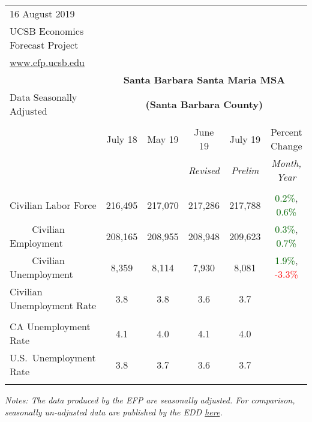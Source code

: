 \documentclass[12pt]{article}
\begin{document}
\begin{table}
\begin{tabular}{|l|c|c|c|c|c|}
\multicolumn{1}{l}{\small 16 August 2019} & \multicolumn{5}{c}{} \\
\multicolumn{1}{l}{\small UCSB Economics Forecast Project} & \multicolumn{5}{c}{} \\
\multicolumn{1}{l}{\small \href{http://www.efp.ucsb.edu/}{www.efp.ucsb.edu}} & \multicolumn{5}{c}{} \\
\multicolumn{1}{c}{} & \multicolumn{5}{c}{\large \textbf{Santa Barbara Santa Maria MSA}} \\
\multicolumn{1}{l}{\small Data Seasonally Adjusted} & \multicolumn{5}{c}{\small \textbf{(Santa Barbara County)}} \\ \hline \hline
& & & & & \\
 & July 18 & May 19 & June 19 & July 19 & Percent Change \\
 & & & \small \textit{Revised} & \small \textit{Prelim} & \small \textit{Month, Year} \\ \hline
& & & & & \\
Civilian Labor Force & 216,495 & 217,070 & 217,286 & 217,788 & \textcolor{darkgreen}{0.2\%}, \textcolor{darkgreen}{0.6\%} \\
$\qquad$ \small Civilian Employment & 208,165 & 208,955 & 208,948 & 209,623 & \textcolor{darkgreen}{0.3\%}, \textcolor{darkgreen}{0.7\%} \\
$\qquad$ \small Civilian Unemployment & 8,359 & 8,114 & 7,930 & 8,081 & \textcolor{darkgreen}{1.9\%}, \textcolor{red}{-3.3\%} \\
Civilian Unemployment Rate & 3.8 & 3.8 & 3.6 & 3.7 & \\
& & & & & \\
CA Unemployment Rate & 4.1 & 4.0 & 4.1 & 4.0 & \\
U.S.\ Unemployment Rate & 3.8 & 3.7 & 3.6 & 3.7 & \\
& & & & & \\ \hline \hline
\end{tabular}
\par
\vspace{.5em}
\footnotesize
\textit{Notes: The data produced by the EFP are seasonally adjusted. For comparison, seasonally un-adjusted data are published by the EDD \href{http://www.labormarketinfo.ca.gov/file/lfmonth/satb$pds.pdf}{here}.}
\end{table}
\end{document}
